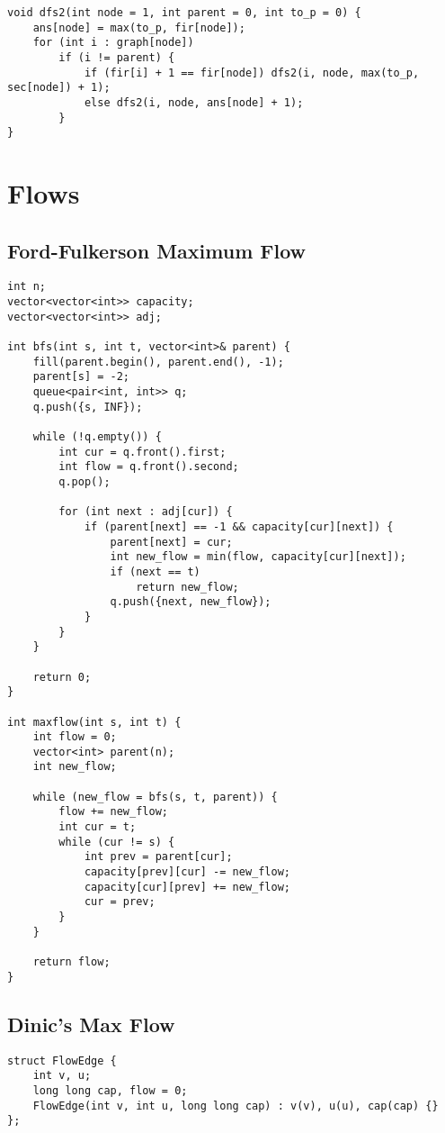 \documentclass[10pt]{article}
\begin{document}
\begin{multicols*}{2}
\begin{lstlisting}[style=compactcpp]
void dfs2(int node = 1, int parent = 0, int to_p = 0) {
	ans[node] = max(to_p, fir[node]);
	for (int i : graph[node])
		if (i != parent) {
			if (fir[i] + 1 == fir[node]) dfs2(i, node, max(to_p, sec[node]) + 1);
			else dfs2(i, node, ans[node] + 1);
		}
}
\end{lstlisting}

\section{Flows}

\subsection{Ford-Fulkerson Maximum Flow}

\begin{lstlisting}[style=compactcpp]
int n;
vector<vector<int>> capacity;
vector<vector<int>> adj;

int bfs(int s, int t, vector<int>& parent) {
    fill(parent.begin(), parent.end(), -1);
    parent[s] = -2;
    queue<pair<int, int>> q;
    q.push({s, INF});

    while (!q.empty()) {
        int cur = q.front().first;
        int flow = q.front().second;
        q.pop();

        for (int next : adj[cur]) {
            if (parent[next] == -1 && capacity[cur][next]) {
                parent[next] = cur;
                int new_flow = min(flow, capacity[cur][next]);
                if (next == t)
                    return new_flow;
                q.push({next, new_flow});
            }
        }
    }

    return 0;
}

int maxflow(int s, int t) {
    int flow = 0;
    vector<int> parent(n);
    int new_flow;

    while (new_flow = bfs(s, t, parent)) {
        flow += new_flow;
        int cur = t;
        while (cur != s) {
            int prev = parent[cur];
            capacity[prev][cur] -= new_flow;
            capacity[cur][prev] += new_flow;
            cur = prev;
        }
    }

    return flow;
}
\end{lstlisting}

\subsection{Dinic's Max Flow}

\begin{lstlisting}[style=compactcpp]
struct FlowEdge {
    int v, u;
    long long cap, flow = 0;
    FlowEdge(int v, int u, long long cap) : v(v), u(u), cap(cap) {}
};


\end{lstlisting}
\end{multicols*}
\end{document}
